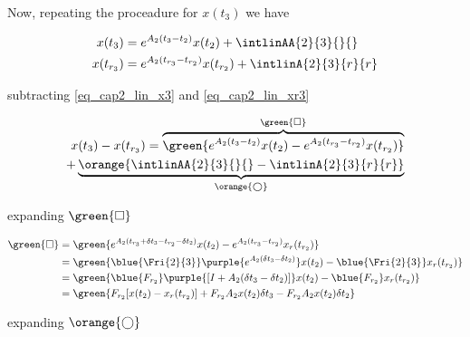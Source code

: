 
Now, repeating the proceadure for $x(t_3)$ we have


\begin{align}
	\label{eq_cap2_lin_x3}
	x(t_3)  &= e^{A_2(t_3-t_2)}x(t_2) + \intlinAA{2}{3}{}{} \\
	\label{eq_cap2_lin_xr3}
	x(t_{r_3}) &= e^{A_2(t_{r_3}-t_{r_2})}x(t_{r_2}) + \intlinA{2}{3}{r}{r}
\end{align}

subtracting \ref{eq_cap2_lin_x3} and \ref{eq_cap2_lin_xr3} 

\begin{equation}
	\label{eq_cap2_lin_erro_x2x3}
	\begin{split}
		x(t_3) - x(t_{r_3}) = \overbrace{\green{e^{A_2(t_3-t_2)}x(t_2) - e^{A_2(t_{r_3}-t_{r_2})}x(t_{r_2})}}^{\green{\square}} \\ 
		+ \underbrace{\orange{\intlinAA{2}{3}{}{} - \intlinA{2}{3}{r}{r}}}_{\orange{\bigcirc}}
	\end{split}
\end{equation}

expanding $\green{\square}$

\begin{align}
	\green{ \square } &=
	\green{
		e^{A_2(t_{r_3} + \delta t_3 - t_{r_2} - \delta t_2)} x(t_2)
		- e^{A_2(t_{r_3} - t_{r_2})} x_r(t_{r_2})
	} \nonumber \\
	&= \green{
		\blue{\Fri{2}{3}} \purple{e^{A_2(\delta t_3 - \delta t_2)}} x(t_2)
		- \blue{\Fri{2}{3}} x_r(t_{r_2})
	} \nonumber \\
	&= \green{
		\blue{F_{r_2}} \purple{[I + A_2(\delta t_3 - \delta t_2)]} x(t_2)
		- \blue{F_{r_2}} x_r(t_{r_2})
	} \nonumber \\
	\label{eq_cap2_lin_x3_green}
	&= \green{
		F_{r_2} [x(t_2) - x_r(t_{r_2})] + F_{r_2} A_2 x(t_2) \delta t_3
		- F_{r_2} A_2 x(t_2) \delta t_2
	}
\end{align}

expanding $\orange{\bigcirc}$

